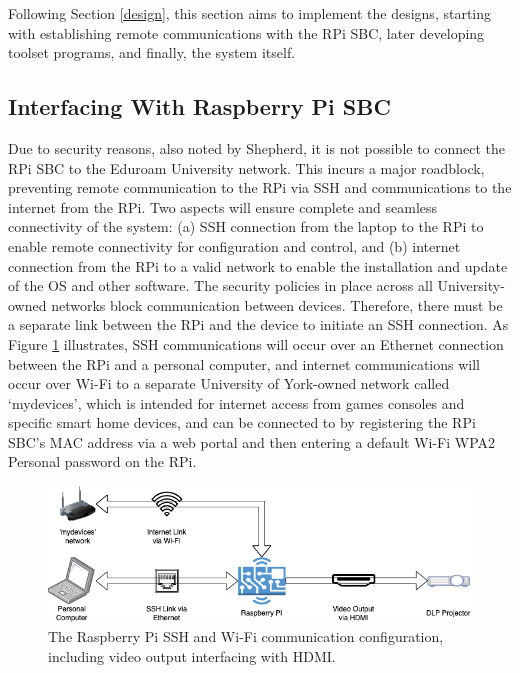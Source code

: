 Following Section \ref{design}, this section aims to implement the designs, starting with establishing remote communications with the RPi SBC, later developing toolset programs, and finally, the system itself.

\subsection{Interfacing With Raspberry Pi SBC}

Due to security reasons, also noted by Shepherd, it is not possible to connect the RPi SBC to the Eduroam University network. This incurs a major roadblock, preventing remote communication to the RPi via SSH and communications to the internet from the RPi. Two aspects will ensure complete and seamless connectivity of the system: (a) SSH connection from the laptop to the RPi to enable remote connectivity for configuration and control, and (b) internet connection from the RPi to a valid network to enable the installation and update of the OS and other software. The security policies in place across all University-owned networks block communication between devices. Therefore, there must be a separate link between the RPi and the device to initiate an SSH connection. As Figure \ref{fig:pi_interfacing} illustrates, SSH communications will occur over an Ethernet connection between the RPi and a personal computer, and internet communications will occur over Wi-Fi to a separate University of York-owned network called `mydevices', which is intended for internet access from games consoles and specific smart home devices, and can be connected to by registering the RPi SBC's MAC address via a web portal and then entering a default Wi-Fi WPA2 Personal password on the RPi.

\begin{figure}[H]
    \centering
    \includegraphics[width=1\textwidth]{assets/interface_diagram.png}
    \caption{The Raspberry Pi SSH and Wi-Fi communication configuration, including video output interfacing with HDMI.}
    \label{fig:pi_interfacing}
\end{figure}

